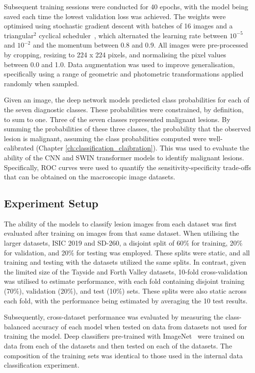 Subsequent training sessions were conducted for 40 epochs, with the model being saved each time the lowest validation loss was achieved. The weights were optimised using stochastic gradient descent with batches of 16 images and a triangular$^2$ cyclical scheduler~\citep{smith2017cyclical}, which alternated the learning rate between $10^{-5}$ and $10^{-2}$ and the momentum between 0.8 and 0.9. All images were pre-processed by cropping, resizing to 224 x 224 pixels, and normalising the pixel values between 0.0 and 1.0. Data augmentation was used to improve generalisation, specifically using a range of geometric and photometric transformations applied randomly when sampled.

Given an image, the deep network models predicted class probabilities for each of the seven diagnostic classes. These probabilities were constrained, by definition, to sum to one. Three of the seven classes represented malignant lesions. By summing the probabilities of these three classes, the probability that the observed lesion is malignant, assuming the class probabilities computed were well-calibrated (Chapter \ref{ch:classification_claibration}). This was used to evaluate the ability of the CNN and SWIN transformer models to identify malignant lesions. Specifically, ROC curves were used to quantify the sensitivity-specificity trade-offs that can be obtained on the macroscopic image datasets. 

\subsection{Experiment Setup}
\label{subsec:generalisation_experiment}
The ability of the models to classify lesion images from each dataset was first evaluated after training on images from that same dataset. When utilising the larger datasets, ISIC 2019 and SD-260, a disjoint split of 60\% for training, 20\% for validation, and 20\% for testing was employed. These splits were static, and all training and testing with the datasets utilized the same splits. In contrast, given the limited size of the Tayside and Forth Valley datasets, 10-fold cross-validation was utilised to estimate performance, with each fold containing disjoint training (70\%), validation (20\%), and test (10\%) sets. These splits were also static across each fold, with the performance being estimated by averaging the 10 test results.

Subsequently, cross-dataset performance was evaluated by measuring the class-balanced accuracy of each model when tested on data from datasets not used for training the model. Deep classifiers pre-trained with ImageNet~\citep{deng2009imagenet} were trained on data from each of the datasets and then tested on each of the datasets. The composition of the training sets was identical to those used in the internal data classification experiment.

